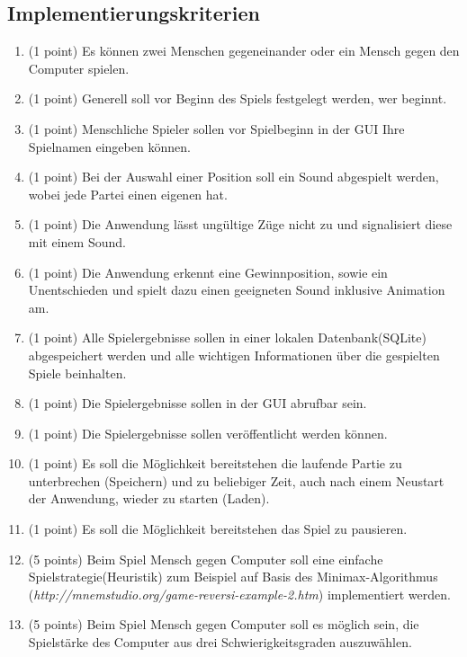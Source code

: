\documentclass[a4paper]{scrartcl}
\begin{document}
\subsection{Implementierungskriterien}
	\begin{enumerate}
		\item (1 point) Es können zwei Menschen gegeneinander oder ein Mensch gegen den Computer spielen.
		\item (1 point) Generell soll vor Beginn des Spiels festgelegt werden, wer beginnt.
		\item (1 point) Menschliche Spieler sollen vor Spielbeginn in der GUI Ihre Spielnamen eingeben können.
		
		
		\item (1 point) Bei der Auswahl einer Position soll ein Sound abgespielt werden, wobei jede Partei einen eigenen hat.
		\item (1 point) Die Anwendung lässt ungültige Züge nicht zu und signalisiert diese mit einem Sound.
		\item (1 point) Die Anwendung erkennt eine Gewinnposition, sowie ein Unentschieden und spielt dazu einen geeigneten Sound inklusive Animation am.
		\item (1 point) Alle Spielergebnisse sollen in einer lokalen Datenbank(SQLite) abgespeichert werden und alle wichtigen Informationen über die gespielten Spiele beinhalten.
		\item (1 point) Die Spielergebnisse sollen in der GUI abrufbar sein.
		\item (1 point) Die Spielergebnisse sollen veröffentlicht werden können.
		\item (1 point) Es soll die Möglichkeit bereitstehen die laufende Partie zu unterbrechen (Speichern) und zu beliebiger Zeit, auch nach einem Neustart der Anwendung, wieder zu starten (Laden).
		\item (1 point) Es soll die Möglichkeit bereitstehen das Spiel zu pausieren.
		\item (5 points) Beim Spiel Mensch gegen Computer soll eine einfache Spielstrategie(Heuristik) zum Beispiel auf Basis des Minimax-Algorithmus (\textit{http://mnemstudio.org/game-reversi-example-2.htm}) implementiert werden.	
		\item (5 points) Beim Spiel Mensch gegen Computer soll es möglich sein, die Spielstärke des Computer aus drei Schwierigkeitsgraden auszuwählen.
		

\end{enumerate}
\end{document}
